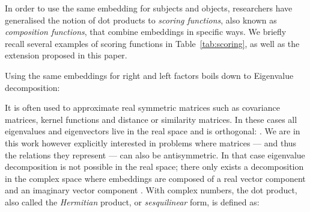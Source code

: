 \documentclass{article}
\begin{document}
In order to use the same embedding for subjects and objects, researchers have generalised the notion of dot products to \emph{scoring functions}, also known as \emph{composition functions}, that combine embeddings in specific ways. We briefly recall several examples of scoring functions in Table~\ref{tab:scoring}, as well
as the extension proposed in this paper. 


\begin{table*}[]
\centering
    \caption{
     Scoring functions of state-of-the-art latent factor models for a given fact , along with their relation parameters, time and space (memory) complexity. The embeddings  and  of subject  and object  are in  for each model, except for our model (ComplEx) where .   is an additional latent dimension of the NTN model. 
 and  denote respectively the Fourier transform and its inverse, and  is the element-wise product between two vectors.
    }
    \label{tab:scoring}
\end{table*}

\newcommand{\normalSpace}{\mathcal{H}}
Using the same embeddings for right and left factors boils down to Eigenvalue decomposition: 

It is often used to approximate real symmetric matrices
such as covariance matrices, kernel functions and distance or similarity matrices. In these cases all eigenvalues and eigenvectors live in the real space and  is orthogonal: . 
We are in this work however explicitly interested in problems where matrices --- and thus the \mbox{relations} they represent ---
can also be antisymmetric. In that case eigenvalue decomposition is not possible in the real space; there only exists a decomposition in the complex space where embeddings  are composed of a real vector component  and an imaginary vector component . With complex numbers, the dot product, also called the \emph{Hermitian} product, or \emph{sesquilinear} form, is defined as: 
 
\end{document}
